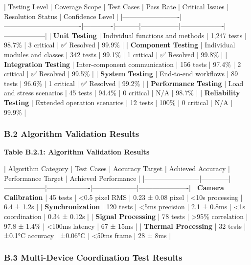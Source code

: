 \documentclass[11pt,a4paper]{article}
\begin{document}
| Testing Level           | Coverage Scope                   | Test Cases  | Pass Rate | Critical Issues | Resolution Status | Confidence Level |
|-------------------------|----------------------------------|-------------|-----------|-----------------|-------------------|------------------|
| \textbf{Unit Testing}        | Individual functions and methods | 1,247 tests | 98.7\%     | 3 critical      | ✅ Resolved        | 99.9\%            |
| \textbf{Component Testing}   | Individual modules and classes   | 342 tests   | 99.1\%     | 1 critical      | ✅ Resolved        | 99.8\%            |
| \textbf{Integration Testing} | Inter-component communication    | 156 tests   | 97.4\%     | 2 critical      | ✅ Resolved        | 99.5\%            |
| \textbf{System Testing}      | End-to-end workflows             | 89 tests    | 96.6\%     | 1 critical      | ✅ Resolved        | 99.2\%            |
| \textbf{Performance Testing} | Load and stress scenarios        | 45 tests    | 94.4\%     | 0 critical      | N/A               | 98.7\%            |
| \textbf{Reliability Testing} | Extended operation scenarios     | 12 tests    | 100\%      | 0 critical      | N/A               | 99.9\%            |

\subsubsection{B.2 Algorithm Validation Results}

\textbf{Table B.2.1: Algorithm Validation Results}

| Algorithm Category     | Test Cases | Accuracy Target  | Achieved Accuracy | Performance Target | Achieved Performance |
|------------------------|------------|------------------|-------------------|--------------------|----------------------|
| \textbf{Camera Calibration} | 45 tests   | <0.5 pixel RMS   | 0.23 ± 0.08 pixel | <10s processing    | 6.4 ± 1.2s           |
| \textbf{Synchronization}    | 120 tests  | <5ms precision   | 2.1 ± 0.8ms       | <1s coordination   | 0.34 ± 0.12s         |
| \textbf{Signal Processing}  | 78 tests   | >95\% correlation | 97.8 ± 1.4\%       | <100ms latency     | 67 ± 15ms            |
| \textbf{Thermal Processing} | 32 tests   | ±0.1°C accuracy  | ±0.06°C           | <50ms frame        | 28 ± 8ms             |

\subsubsection{B.3 Multi-Device Coordination Test Results}
\end{document}
